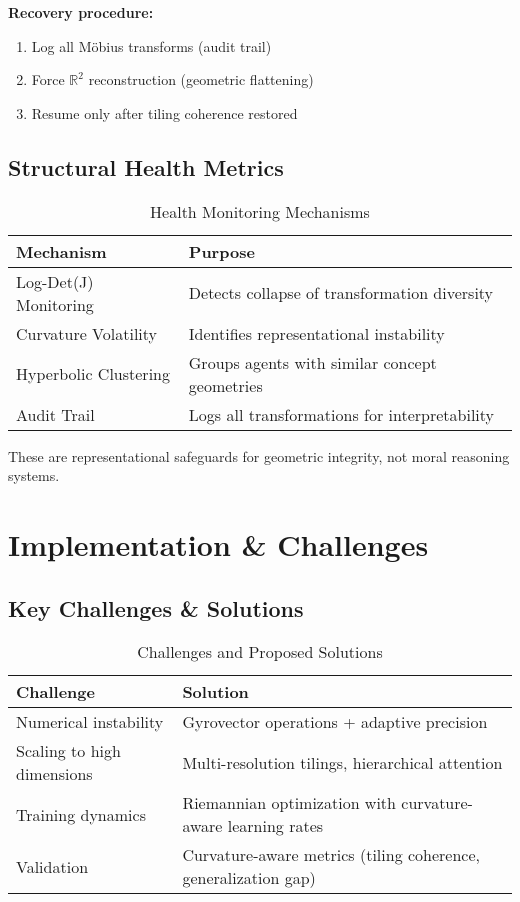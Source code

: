 \documentclass[10pt]{article}
\begin{document}
\textbf{Recovery procedure:}
\begin{enumerate}
    \item Log all Möbius transforms (audit trail)
    \item Force $\mathbb{R}^2$ reconstruction (geometric flattening)  
    \item Resume only after tiling coherence restored
\end{enumerate}

\subsection{Structural Health Metrics}

\begin{table}[H]
\centering
\caption{Health Monitoring Mechanisms}
\begin{tabular}{lp{10cm}}
\toprule
Mechanism & Purpose \\
\midrule
Log-Det(J) Monitoring & Detects collapse of transformation diversity \\
Curvature Volatility & Identifies representational instability \\
Hyperbolic Clustering & Groups agents with similar concept geometries \\
Audit Trail & Logs all transformations for interpretability \\
\bottomrule
\end{tabular}
\end{table}

These are representational safeguards for geometric integrity, not moral reasoning systems.

\section{Implementation \& Challenges}

\subsection{Key Challenges \& Solutions}

\begin{table}[H]
\centering
\caption{Challenges and Proposed Solutions}
\begin{tabular}{lp{10cm}}
\toprule
Challenge & Solution \\
\midrule
Numerical instability & Gyrovector operations + adaptive precision \\
Scaling to high dimensions & Multi-resolution tilings, hierarchical attention \\
Training dynamics & Riemannian optimization with curvature-aware learning rates \\
Validation & Curvature-aware metrics (tiling coherence, generalization gap) \\
\bottomrule
\end{tabular}
\end{table}
\end{document}
